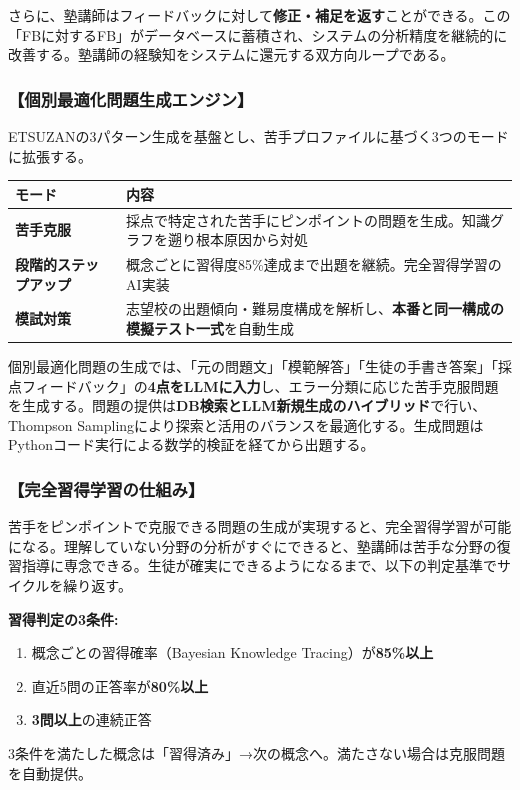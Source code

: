 \documentclass[paper=a4,fontsize=10.5bp,jafontsize=10.5bp,twocolumn]{jlreq}
\begin{document}
さらに、塾講師はフィードバックに対して\textbf{修正・補足を返す}ことができる。この「FBに対するFB」がデータベースに蓄積され、システムの分析精度を継続的に改善する。塾講師の経験知をシステムに還元する双方向ループである。

\subsubsection{【個別最適化問題生成エンジン】}

ETSUZANの3パターン生成を基盤とし、苦手プロファイルに基づく3つのモードに拡張する。


\begin{footnotesize}\noindent
\begin{tabularx}{\linewidth}{>{\bfseries}l X}
\toprule
モード & 内容 \\
\midrule
苦手克服 & 採点で特定された苦手にピンポイントの問題を生成。知識グラフを遡り根本原因から対処 \\
段階的ステップアップ & 概念ごとに習得度85\%達成まで出題を継続。完全習得学習のAI実装 \\
模試対策 & 志望校の出題傾向・難易度構成を解析し、\textbf{本番と同一構成の模擬テスト一式}を自動生成 \\
\bottomrule
\end{tabularx}
\end{footnotesize}


個別最適化問題の生成では、「元の問題文」「模範解答」「生徒の手書き答案」「採点フィードバック」の\textbf{4点をLLMに入力}し、エラー分類に応じた苦手克服問題を生成する。問題の提供は\textbf{DB検索とLLM新規生成のハイブリッド}で行い、Thompson Samplingにより探索と活用のバランスを最適化する。生成問題はPythonコード実行による数学的検証を経てから出題する。

\subsubsection{【完全習得学習の仕組み】}

苦手をピンポイントで克服できる問題の生成が実現すると、完全習得学習が可能になる。理解していない分野の分析がすぐにできると、塾講師は苦手な分野の復習指導に専念できる。生徒が確実にできるようになるまで、以下の判定基準でサイクルを繰り返す。

\begin{graybox}
\textbf{習得判定の3条件:}
\begin{enumerate}[leftmargin=2em]
  \item 概念ごとの習得確率（Bayesian Knowledge Tracing）が\textbf{85\%以上}
  \item 直近5問の正答率が\textbf{80\%以上}
  \item \textbf{3問以上}の連続正答
\end{enumerate}
3条件を満たした概念は「習得済み」→次の概念へ。満たさない場合は克服問題を自動提供。
\end{graybox}
\end{document}
